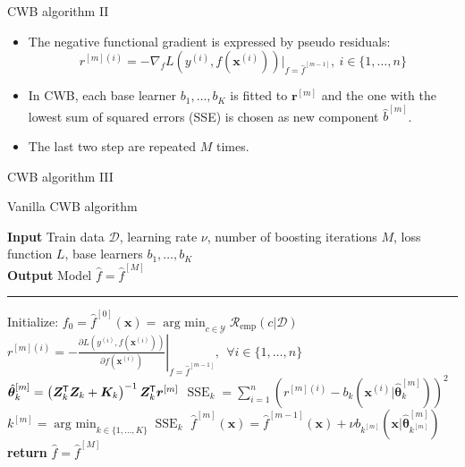 \documentclass[ignorenonframetext,]{beamer}
\providecommand{\tightlist}{%
  \setlength{\itemsep}{0pt}\setlength{\parskip}{0pt}}
\newcommand*{\tran}{{\mkern-1.5mu\mathsf{T}}}
\newcommand{\D}{\mathcal{D}}
\newcommand{\fh}{\hat{f}}
\newcommand{\fmh}{\fh^{[m]}}
\newcommand{\fmdh}{\fh^{[m-1]}}
\newcommand{\blk}{k}
\newcommand{\blK}{K}
\newcommand{\tbh}{\hat{\bm{\theta}}}
\newcommand{\tbmh}{\hat{\bm{\theta}}^{[m]}}
\newcommand{\tbih}[1][i]{\tbh^{(#1)}}
\newcommand{\xv}{\bm{x}}
\newcommand{\pr}{r}
\newcommand{\prv}{\bm{r}}
\newcommand{\rmi}{\pr^{[m](i)}}
\newcommand{\pd}[2]{\frac{\partial #1}{\partial #2}}
\renewcommand{\xi}[1][i]{\xv^{(#1)}}
\newcommand{\yi}[1][i]{y^{(#1)}}
\newcommand{\Lxyi}{L(\yi, f(\xi))}
\newcommand{\design}{\bm{Z}}
\newcommand{\sse}{\operatorname{SSE}}
\newcommand{\argmin}{\operatorname{arg~min}}
\newcommand{\riske}{\mathcal{R}_{\text{emp}}}
\newcommand{\rmm}{\prv^{[m]}}
\begin{document}
\begin{frame}{CWB algorithm II}
\protect\hypertarget{cwb-algorithm-ii}{}
\begin{itemize}
\tightlist
\item
  The negative functional gradient is expressed by pseudo residuals:
  \[\rmi = -\nabla_f L(y^{(i)}, f(\xi))|_{f = \fmdh},\ i \in \{1, \dots, n\}\]
\item
  In CWB, each base learner \(b_1, \dots, b_K\) is fitted to \(\rmm\)
  and the one with the lowest sum of squared errors (SSE) is chosen as
  new component \(\hat{b}^{[m]}\).
\item
  The last two step are repeated \(M\) times.
\end{itemize}
\end{frame}

\begin{frame}{CWB algorithm III}
\protect\hypertarget{cwb-algorithm-iii}{}
\begin{algorithm}[H]

\footnotesize

\caption{Vanilla CWB algorithm}\label{algo:cwb}
\vspace{0.15cm}
\hspace*{\algorithmicindent} \textbf{Input} Train data $\D$, learning rate $\nu$, number of boosting iterations $M$, loss\\
\hspace*{\algorithmicindent}  function $L$, base learners $b_1, \dots, b_\blK$\\
\hspace*{\algorithmicindent} \textbf{Output} Model $\fh = \hat{f}^{[M]}$%
\hrule

\begin{algorithmic}[1]
\Procedure{$\operatorname{CWB}$}{$\D,\nu,L,b_1, \dots, b_\blK$}
    \State Initialize: $f_0 = \fh^{[0]}(\xv) = \argmin_{c\in\mathcal{Y}}\riske(c|\D)$
        \State $\rmi = -\left.\pd{\Lxyi}{f(\xi)}\right|_{f = \fmdh},\ \ \forall i \in \{1, \dots, n\}$%
        \For{$\blk \in \{1, \dots, \blK\}$}
            \State $\tbmh_\blk = \left(\design_\blk^\tran \design_\blk + \bm{K}_\blk\right)^{-1} \design^\tran_\blk \rmm$%
            \State $\sse_\blk = \sum_{i=1}^n(\rmi - b_\blk(\xi | \tbmh_\blk))^2$%
        \EndFor
        \State $\blk^{[m]} = \argmin_{\blk\in\{1, \dots, \blK\}} \sse_\blk$%
        \State $\fmh(\xv) = \fmdh(\xv) + \nu b_{\blk^{[m]}} (\xv | \tbmh_{\blk^{[m]}})$
    \EndWhile
    \State \textbf{return} $\fh = \fh^{[M]}$
\EndProcedure
\end{algorithmic}
\end{algorithm}
\end{frame}
\end{document}
